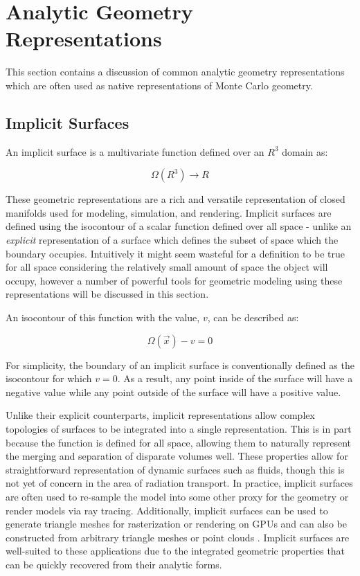 \section{Analytic Geometry Representations}\label{sec:analytic_geometry}

This section contains a discussion of common analytic geometry  representations
which are often used as native representations of Monte Carlo geometry.

\subsection{Implicit Surfaces}\label{subsec:implicit_surfaces}

An implicit surface is a multivariate function defined over an $ R^3 $ domain as:

\begin{equation}
    \Omega(R^3)\rightarrow R
\end{equation}

These geometric representations are a rich and versatile representation of
closed manifolds used for modeling, simulation, and rendering. Implicit surfaces
are defined using the isocontour of a scalar function defined over all space -
unlike an \textit{explicit} representation of a surface which defines the subset
of space which the boundary occupies. Intuitively it might seem wasteful for a
definition to be true for all space considering the relatively small amount of
space the object will occupy, however a number of powerful tools for geometric
modeling using these representations will be discussed in this section.

An isocontour of this function with the value, $v$, can be described as:

\begin{equation}
  \Omega(\vec{x}) - v  = 0 
\end{equation}

For simplicity, the boundary of an implicit surface is conventionally defined as
the isocontour for which $v=0$. As a result, any point inside of the surface
will have a negative value while any point outside of the surface will have a
positive value.

Unlike their explicit counterparts, implicit representations allow complex
topologies of surfaces to be integrated into a single representation. This is in
part because the function is defined for all space, allowing them to naturally
represent the merging and separation of disparate volumes well. These properties
allow for straightforward representation of dynamic surfaces such as fluids,
though this is not yet of concern in the area of radiation transport. In
practice, implicit surfaces are often used to re-sample the model into some
other proxy for the geometry or render models via ray tracing. Additionally,
implicit surfaces can be used to generate triangle meshes for rasterization or
rendering on GPUs \cite{Sethian_1996} and can also be constructed from arbitrary
triangle meshes or point clouds \cite{Sigg_2006}. Implicit surfaces are
well-suited to these applications due to the integrated geometric properties
that can be quickly recovered from their analytic forms.

